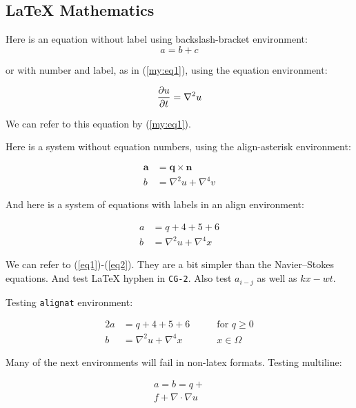 \n\documentclass[%
oneside,                 %
final,                   %
10pt]{article}
\theoremstyle{definition}
\begin{document}
\begin{enumerate}

\section{{\LaTeX} Mathematics}

Here is an equation without label using backslash-bracket environment:
\[ a = b + c \]

or with number and label, as in (\ref{my:eq1}), using the equation environment:

\begin{equation}
{\partial u\over\partial t} = \nabla^2 u \label{my:eq1}
\end{equation}

We can refer to this equation by (\ref{my:eq1}).

Here is a system without equation numbers, using the align-asterisk environment:

\begin{align*}
\pmb{a} &= \pmb{q}\times\pmb{n} \\ 
b &= \nabla^2 u + \nabla^4 v
\end{align*}

And here is a system of equations with labels in an align environment:

\begin{align}
a &= q + 4 + 5+ 6 \label{eq1} \\ 
b &= \nabla^2 u + \nabla^4 x \label{eq2}
\end{align}

We can refer to (\ref{eq1})-(\ref{eq2}). They are a bit simpler than
the Navier--Stokes equations. And test {\LaTeX} hyphen in \texttt{CG-2}.
Also test $a_{i-j}$ as well as $kx-wt$.

Testing \texttt{alignat} environment:

\begin{alignat}{2}
a &= q + 4 + 5+ 6\qquad & \mbox{for } q\geq 0 \label{eq1a} \\ 
b &= \nabla^2 u + \nabla^4 x & x\in\Omega \label{eq2a}
\end{alignat}

Many of the next environments will fail in non-latex formats.
Testing multiline:

\begin{multline}
a = b = q + \\ 
  f + \nabla\cdot\nabla u
\label{multiline:eq1}
\end{multline}


\end{enumerate}
\end{document}

